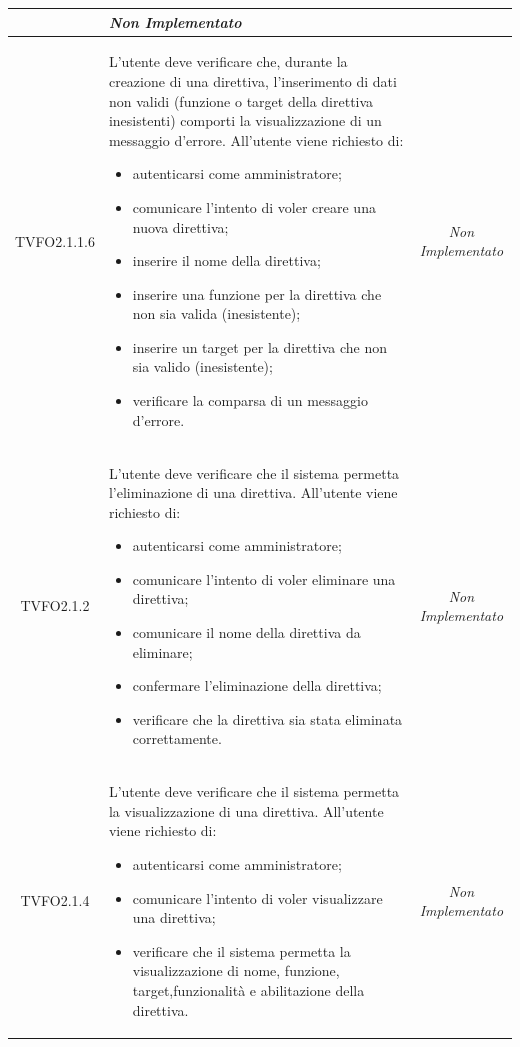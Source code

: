\begin{longtable}{|c|>{}m{8cm}|c|}
\begin{itemize}
\end{itemize}
 & \textit{Non Implementato}\\ \hline
\hypertarget{TVFO2.1.1.6}{TVFO2.1.1.6} & L'utente deve verificare che, durante la creazione di una direttiva, l'inserimento di dati non validi (funzione o target della direttiva inesistenti) comporti la visualizzazione di un messaggio d'errore. All'utente viene richiesto di:
\begin{itemize}
\item autenticarsi come amministratore;
\item comunicare l'intento di voler creare una nuova direttiva;
\item inserire il nome della direttiva;
\item inserire una funzione per la direttiva che non sia valida (inesistente);
\item inserire un target per la direttiva che non sia valido (inesistente);
\item verificare la comparsa di un messaggio d'errore.
\end{itemize} & \textit{Non Implementato}\\ \hline
\hypertarget{TVFO2.1.2}{TVFO2.1.2} & L'utente deve verificare che il sistema permetta l'eliminazione di una direttiva. All'utente viene richiesto di:
\begin{itemize}
\item autenticarsi come amministratore;
\item comunicare l'intento di voler eliminare una direttiva;
\item comunicare il nome della direttiva da eliminare;
\item confermare l'eliminazione della direttiva;
\item verificare che la direttiva sia stata eliminata correttamente.
\end{itemize}
 & \textit{Non Implementato}\\ \hline
\hypertarget{TVFO2.1.4}{TVFO2.1.4} & L'utente deve verificare che il sistema permetta la visualizzazione di una direttiva. All'utente viene richiesto di:
\begin{itemize}
\item autenticarsi come amministratore;
\item comunicare l'intento di voler visualizzare una direttiva;
\item verificare che il sistema permetta la visualizzazione di nome, funzione, target,funzionalità e abilitazione della direttiva.
\end{itemize} & \textit{Non Implementato}\\ \hline

\end{longtable}
